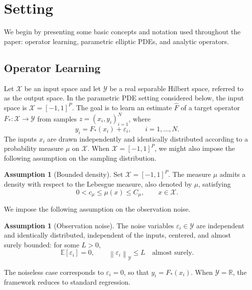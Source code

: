 \documentclass[11pt]{article}
\numberwithin{equation}{section}
\theoremstyle{plain}
\theoremstyle{definition}
\newtheorem{assumption}[theorem]{Assumption}
\theoremstyle{remark}
\newcommand{\EXP}{\mathbb{E}}
\newcommand{\norm}[1]{\left\lVert#1\right\rVert}
\begin{document}
\section{Setting} \label{sec:setting}

We begin by presenting some basic concepts and notation used throughout the
paper: operator learning, parametric elliptic PDEs, and analytic operators.

\subsection{Operator Learning} \label{subsec:op_learn}

Let $\mathcal{X}$ be an input space and let $\mathcal{Y}$ be a real separable
Hilbert space, referred to as the output space. In the parametric PDE setting
considered below, the input space is
$\mathcal{X}=[-1,1]^P$. The goal is to learn an estimate $\hat{F}$ of a target
operator $F_*\colon\mathcal{X}\to\mathcal{Y}$ from samples
$z=(x_i,y_i)_{i=1}^N$, where
\begin{equation}\label{eq:xiyi}
y_i = F_*(x_i) + \varepsilon_i,
\qquad i=1,\dots,N.
\end{equation}
The inputs $x_i$ are drawn independently and identically distributed
according to a probability measure $\mu$ on $\mathcal{X}$. When $\mathcal{X}=[-1,1]^P$, we might also impose the following assumption on the sampling distribution.
\begin{assumption}[Bounded density]\label{as:sampling}
Set $\mathcal{X}=[-1,1]^P$. The measure $\mu$ admits a density with respect to the Lebesgue measure, also denoted by $\mu$, satisfying
\begin{equation}
\label{bound_dens}
0<c_\mu\leq\mu(x)\leq C_\mu,
\qquad x\in\mathcal{X}.
\end{equation}
\end{assumption}
We impose the following assumption on the observation noise.
\begin{assumption}[Observation noise]\label{as:noise}
The noise variables $\varepsilon_i\in\mathcal{Y}$ are independent and
identically distributed, independent of the inputs, centered, and almost
surely bounded: for some $L>0$,
\[
\EXP[\varepsilon_i]=0,
\qquad
\norm{\varepsilon_i}_{\mathcal{Y}}\leq L
\quad\text{almost surely}.
\]
\end{assumption}
The noiseless case corresponds to $\varepsilon_i=0$, so that
$y_i=F_*(x_i)$. When $\mathcal{Y}=\mathbb{R}$, the framework reduces to
standard regression.
\end{document}
